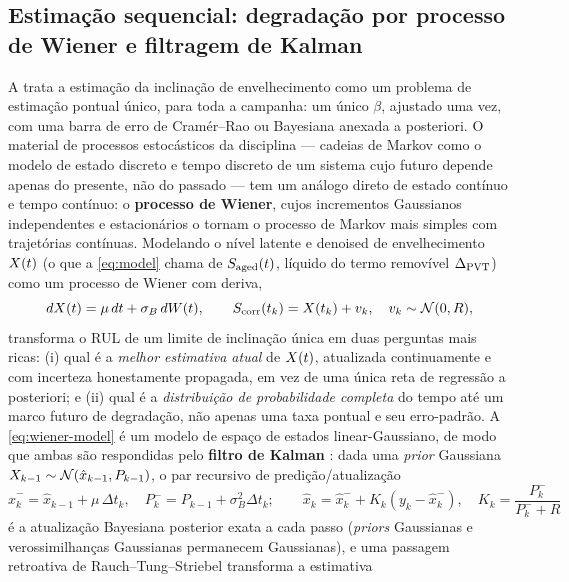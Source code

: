 \subsection{Estimação sequencial: degradação por processo de Wiener e filtragem de Kalman}
\label{sec:th-wiener}
A  trata a estimação da inclinação de envelhecimento
como um problema de estimação pontual único, para toda a campanha: um único
$\beta$, ajustado uma vez, com uma barra de erro de Cram\'er--Rao ou
Bayesiana anexada a posteriori. O material de processos estocásticos da
disciplina --- cadeias de Markov como o modelo de estado discreto e tempo
discreto de um sistema cujo futuro depende apenas do presente, não do
passado --- tem um análogo direto de estado contínuo e tempo contínuo: o
\textbf{processo de Wiener}, cujos incrementos Gaussianos independentes e
estacionários o tornam o processo de Markov mais simples com trajetórias
contínuas. Modelando o nível latente e denoised de envelhecimento $X(t)$
(o que a \cref{eq:model} chama de $S_{\mathrm{aged}}(t)$, líquido do termo removível
$\Delta_{\mathrm{PVT}}$) como um processo de Wiener com deriva,
\begin{equation}
  dX(t) = \mu\,dt + \sigma_B\,dW(t), \qquad
  S_{\mathrm{corr}}(t_k) = X(t_k) + v_k,\quad v_k\sim\mathcal N(0,R),
  \label{eq:wiener-model}
\end{equation}
transforma o RUL de um limite de inclinação única em duas perguntas mais
ricas: (i) qual é a \emph{melhor estimativa atual} de $X(t)$, atualizada
continuamente e com incerteza honestamente propagada, em vez de uma única
reta de regressão a posteriori; e (ii) qual é a \emph{distribuição de
probabilidade completa} do tempo até um marco futuro de degradação, não
apenas uma taxa pontual e seu erro-padrão. A \cref{eq:wiener-model} é um
modelo de espaço de estados linear-Gaussiano, de modo que ambas são
respondidas pelo \textbf{filtro de Kalman} \cite{kalman1960}: dada uma
\emph{prior} Gaussiana $X_{k-1}\sim\mathcal N(\hat x_{k-1},P_{k-1})$, o
par recursivo de predição/atualização
\begin{equation}
  \hat x_{k}^{-} = \hat x_{k-1}+\mu\,\Delta t_k,\quad
  P_{k}^{-} = P_{k-1}+\sigma_B^2\Delta t_k;\qquad
  \hat x_k = \hat x_k^{-} + K_k(y_k-\hat x_k^{-}),\quad
  K_k=\frac{P_k^{-}}{P_k^{-}+R}
  \label{eq:kalman}
\end{equation}
é a atualização Bayesiana posterior exata a cada passo (\emph{priors}
Gaussianas e verossimilhanças Gaussianas permanecem Gaussianas), e uma
passagem retroativa de Rauch--Tung--Striebel transforma a estimativa
